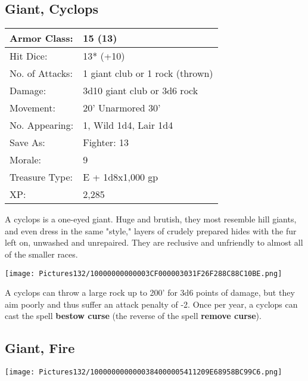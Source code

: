 \documentclass[a4paper,twoside,openany,10pt]{book}
\begin{document}
\begin{multicols}{2}
\subsection*{Giant, Cyclops}\label{giant-cyclops}

\begin{tabularx}{0.48\textwidth}{@{}lX@{}}
Armor Class: & 15 (13) \\\hline
Hit Dice: & 13* (+10) \\\hline
No. of Attacks: & 1 giant club or 1 rock (thrown) \\\hline
Damage: & 3d10 giant club or 3d6 rock \\\hline
Movement: & 20' Unarmored 30' \\\hline
No. Appearing: & 1, Wild 1d4, Lair 1d4 \\\hline
Save As: & Fighter: 13 \\\hline
Morale: & 9 \\\hline
Treasure Type: & E + 1d8x1,000 gp \\\hline
XP: & 2,285 \\\hline
\end{tabularx}\medskip

A cyclops is a one-eyed giant. Huge and brutish, they most resemble hill giants, and even dress in the same "style," layers of crudely prepared hides with the fur left on, unwashed and unrepaired. They are reclusive and unfriendly to almost all of the smaller races.

\begin{center}
	\texttt{[image: Pictures132/10000000000003CF000003031F26F288C88C10BE.png]}
\end{center}


A cyclops can throw a large rock up to 200' for 3d6 points of damage, but they aim poorly and thus suffer an attack penalty of -2. Once per year, a cyclops can cast the spell \textbf{bestow curse} (the reverse of the spell \textbf{remove curse}).


\subsection*{Giant, Fire}\label{giant-fire}


\texttt{[image: Pictures132/1000000000000384000005411209E68958BC99C6.png]}



\end{multicols}
\end{document}
